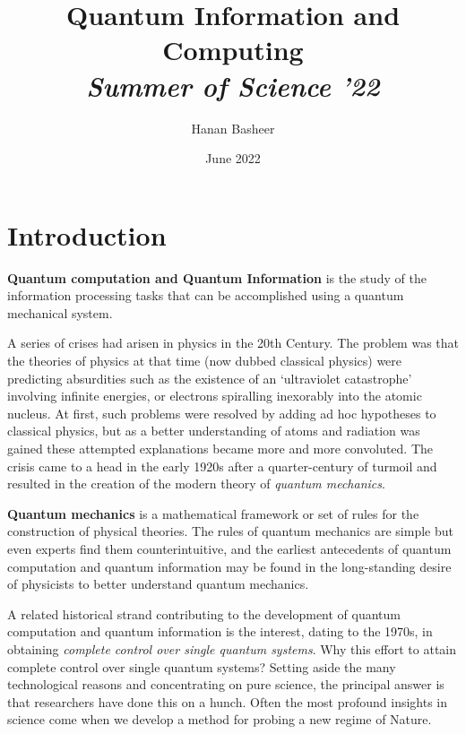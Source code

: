 \documentclass[20pt]{report}
\begin{document}
\begin{titlepage}
\author{Hanan Basheer} 
\title{Quantum Information and Computing\\
\textit{\Large Summer of Science '22}} 
\date{June 2022}
\maketitle
\end{titlepage}

\tableofcontents{}

\part{Introduction}
\textbf{Quantum computation and Quantum Information} is the study of the information processing tasks that can be accomplished using a quantum mechanical system. 
\par A series of crises had arisen in physics in the 20th Century. The problem was that the theories of physics at that time (now dubbed classical physics) were predicting absurdities such as the existence of an ‘ultraviolet catastrophe’ involving infinite energies, or electrons spiralling inexorably into the atomic nucleus. At first, such problems were resolved by adding ad hoc hypotheses to classical physics, but as a better understanding of atoms and radiation was gained these attempted explanations became more and more convoluted. The crisis came to a head in the early 1920s after a quarter-century of turmoil and resulted in the creation of the modern theory of \textit{quantum mechanics}.
\par
\textbf{Quantum mechanics} is a mathematical framework or set of rules for the construction of physical theories. The rules of quantum mechanics are simple but even experts find them counterintuitive, and the earliest antecedents of quantum computation and quantum information may be found in the long-standing desire of physicists to better understand quantum mechanics. 
\par A related historical strand contributing to the development of quantum computation and quantum information is the interest, dating to the 1970s, in obtaining \textit{complete control over single quantum systems}. Why this effort to attain complete control over single quantum systems? Setting aside the many technological reasons and concentrating on pure science, the principal answer is that researchers have done this on a hunch. Often the most profound insights in science come when we develop a method for probing a new regime of Nature. 
\end{document}

